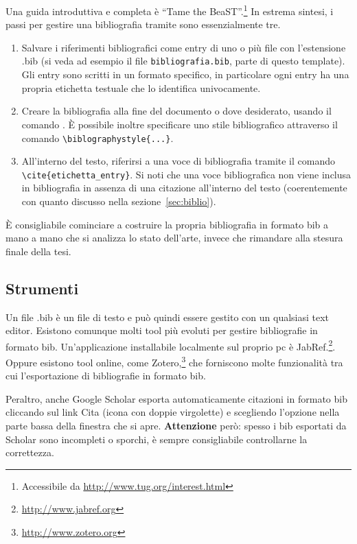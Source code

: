 \documentclass[12pt]{report}
\begin{document}
Una guida introduttiva e completa \`e ``Tame the BeaST''.\footnote{Accessibile da \url{http://www.tug.org/interest.html}} 
In estrema sintesi, i passi per gestire una bibliografia tramite  sono essenzialmente tre.
\begin{enumerate}
\item Salvare i riferimenti bibliografici come entry di uno o pi\`u file con l'estensione .bib (si veda ad esempio il file \texttt{bibliografia.bib}, parte di questo template). Gli entry sono scritti in un formato specifico, in particolare ogni entry ha una propria etichetta testuale che lo identifica univocamente.
\item Creare la bibliografia alla fine del documento o dove desiderato, usando il comando \verb||. \`E possibile inoltre specificare uno stile bibliografico attraverso il comando \verb|\biblographystyle{...}|.
\item All'interno del testo, riferirsi a una voce di bibliografia tramite il comando\\ \verb|\cite{etichetta_entry}|. Si noti che una voce bibliografica non viene inclusa in bibliografia in assenza di una citazione all'interno del testo (coerentemente con quanto discusso nella sezione~\ref{sec:biblio}).
\end{enumerate}

\`E consigliabile cominciare a costruire la propria bibliografia in formato bib a mano a mano che si analizza lo stato dell'arte, invece che rimandare alla stesura finale della tesi.

\subsection{Strumenti}

Un file .bib \`e un file di testo e pu\`o quindi essere gestito con un qualsiasi text editor. Esistono comunque molti tool pi\`u evoluti per gestire bibliografie in formato bib. Un'applicazione installabile localmente sul proprio pc \`e JabRef.\footnote{\url{http://www.jabref.org}}. Oppure esistono tool online, come Zotero,\footnote{\url{http://www.zotero.org}} che forniscono molte funzionalità tra cui l'esportazione di bibliografie in formato bib.

Peraltro, anche Google Scholar esporta automaticamente citazioni in formato bib cliccando sul link Cita (icona con doppie virgolette) e scegliendo l'opzione  nella parte bassa della finestra che si apre. \textbf{Attenzione} per\`o: spesso i bib esportati da Scholar sono incompleti o sporchi, \`e sempre consigliabile controllarne la correttezza.
\end{document}
